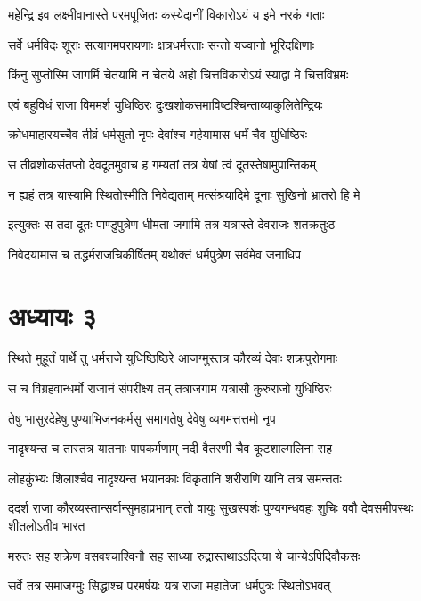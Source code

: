 \twolineshloka
{महेन्द्रि इव लक्ष्मीवानास्ते परमपूजितः}
{कस्येदानीं विकारोऽयं य इमे नरकं गताः}


\twolineshloka
{सर्वे धर्मविदः शूराः सत्यागमपरायणाः}
{क्षत्रधर्मरताः सन्तो यज्वानो भूरिदक्षिणाः}


\twolineshloka
{किंनु सुप्तोस्मि जागर्मि चेतयामि न चेतये}
{अहो चित्तविकारोऽयं स्याद्वा मे चित्तविभ्रमः}


\twolineshloka
{एवं बहुविधं राजा विममर्श युधिष्ठिरः}
{दुःखशोकसमाविष्टश्चिन्ताव्याकुलितेन्द्रियः}


\twolineshloka
{क्रोधमाहारयच्चैव तीव्रं धर्मसुतो नृपः}
{देवांश्च गर्हयामास धर्मं चैव युधिष्ठिरः}


\twolineshloka
{स तीव्रशोकसंतप्तो देवदूतमुवाच ह}
{गम्यतां तत्र येषां त्वं दूतस्तेषामुपान्तिकम्}


\twolineshloka
{न ह्यहं तत्र यास्यामि स्थितोस्मीति निवेद्यताम्}
{मत्संश्रयादिमे दूनाः सुखिनो भ्रातरो हि मे}


\twolineshloka
{इत्युक्तः स तदा दूतः पाण्डुपुत्रेण धीमता}
{जगामि तत्र यत्रास्ते देवराजः शतक्रतुःठ}


\twolineshloka
{निवेदयामास च तद्धर्मराजचिकीर्षितम्}
{यथोक्तं धर्मपुत्रेण सर्वमेव जनाधिप}


\chapter{अध्यायः ३}
\twolineshloka
{स्थिते मुहूर्तं पार्थे तु धर्मराजे युधिष्ठिष्ठिरे}
{आजग्मुस्तत्र कौरव्यं देवाः शक्रपुरोगमाः}


\twolineshloka
{स च विग्रहवान्धर्मो राजानं संपरीक्ष्य तम्}
{तत्राजगाम यत्रासौ कुरुराजो युधिष्ठिरः}


\twolineshloka
{तेषु भासुरदेहेषु पुण्याभिजनकर्मसु}
{समागतेषु देवेषु व्यगमत्तत्तमो नृप}


\twolineshloka
{नादृश्यन्त च तास्तत्र यातनाः पापकर्मणाम्}
{नदी वैतरणी चैव कूटशाल्मलिना सह}


\twolineshloka
{लोहकुंभ्यः शिलाश्चैव नादृश्यन्त भयानकाः}
{विकृतानि शरीराणि यानि तत्र समन्ततः}


ददर्श राजा कौरव्यस्तान्सर्वान्सुमहाप्रभान्
\twolineshloka
{ततो वायुः सुखस्पर्शः पुण्यगन्धवहः शुचिः}
{ववौ देवसमीपस्थः शीतलोऽतीव भारत}


\threelineshloka
{मरुतः सह शक्रेण वसवश्चाश्विनौ सह}
{साध्या रुद्रास्तथाऽऽदित्या ये चान्येऽपिदिवौकसः}
{}


\twolineshloka
{सर्वे तत्र समाजग्मुः सिद्धाश्च परमर्षयः}
{यत्र राजा महातेजा धर्मपुत्रः स्थितोऽभवत्}


